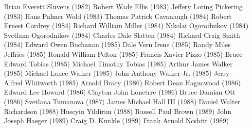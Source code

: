 \documentclass{report}
\begin{document}
\begin{refsegment}
\begin{multicols}{2}
Brian Everett Sluvens (1982)\newline
Robert Wade Ellis (1983)\newline
Jeffery Loring Pickering (1983)\newline
Hans Palmer Wold (1983)\newline
Thomas Patrick Cavanaugh (1984)\newline
Robert Ernest Cordrey (1984)\newline
Richard William Miller (1984)\newline
Nikolai Ogorodnikov (1984)\newline
Svetlana Ogorodnikov (1984)\newline
Charles Dale Slatten (1984)\newline
Richard Craig Smith (1984)\newline
Edward Owen Buchanan (1985)\newline
Dale Vern Irene (1985)\newline
Randy Miles Jeffries (1985)\newline
Ronald William Pelton (1985)\newline
Francis Xavier Pizzo (1985)\newline
Bruce Edward Tobias (1985)\newline
Michael Timothy Tobias (1985)\newline
Arthur James Walker (1985)\newline
Michael Lance Walker (1985)\newline
John Anthony Walker Jr. (1985)\newline
Jerry Alfred Whitworth (1985)\newline
Arnold Bracy (1986)\newline
Robert Dean Hagucwood (1986)\newline
Edward Lee Howard (1986)\newline
Clayton John Lonetrre (1986)\newline
Bruce Damian Ott (1986)\newline
Svetlana Tumanova (1987)\newline
James Michael Hall III (1988)\newline
Daniel Walter Richardson (1988)\newline
Huscyin Yildirim (1988)\newline
Russell Paul Brown (1989)\newline
John Joseph Haeger (1989)\newline
Craig D. Kunkle (1989)\newline
Frank Arnold Ncsbitt (1989)\newline

\end{multicols}
\end{refsegment}
\end{document}
